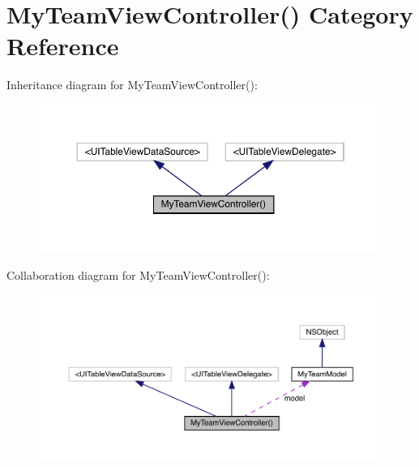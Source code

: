 \hypertarget{category_my_team_view_controller_07_08}{}\section{My\+Team\+View\+Controller() Category Reference}
\label{category_my_team_view_controller_07_08}


Inheritance diagram for My\+Team\+View\+Controller()\+:\nopagebreak
\begin{figure}[H]
\begin{center}
\leavevmode
\includegraphics[width=350pt]{category_my_team_view_controller_07_08__inherit__graph}
\end{center}
\end{figure}


Collaboration diagram for My\+Team\+View\+Controller()\+:\nopagebreak
\begin{figure}[H]
\begin{center}
\leavevmode
\includegraphics[width=350pt]{category_my_team_view_controller_07_08__coll__graph}
\end{center}
\end{figure}
